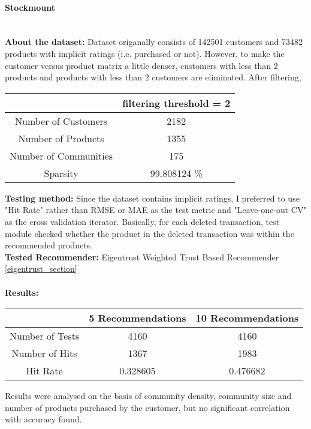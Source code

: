	\paragraph{Stockmount} \mbox{}\\
	\textbf{About the dataset:} Dataset origanally consists of 142501 customers and 73482 products with implicit ratings (i.e. purchased or not). However, to make the customer versus product matrix a little denser, customers with less than 2 products and products with less than 2 customers are eliminated. After filtering,
	\begin{center}
		\begin{tabular}{ | c | c |}
			\hline
			& filtering threshold = 2\\ 
			\hline
			Number of Customers & 2182\\  
			\hline
			Number of Products & 1355\\  
			\hline
			Number of Communities & 175\\  
			\hline
			Sparsity & 99.808124 \% \\   
			\hline
		\end{tabular}
	\end{center} 
	\vspace{0.5cm}
	\textbf{Testing method:} Since the dataset contains implicit ratings, I preferred to use "Hit Rate" rather than RMSE or MAE as the test metric and "Leave-one-out CV" as the cross validation iterator. Basically, for each deleted transaction, test module checked whether the product in the deleted transaction was within the recommended products.\\
	\textbf{Tested Recommender:} Eigentrust Weighted Trust Based Recommender \ref{eigentrust_section} \\ \\
	\textbf{Results:}
	\begin{center}
		\begin{tabular}{ | c | c | c |}
			\hline
			& 5 Recommendations & 10 Recommendations\\ 
			\hline
			Number of Tests&  4160 & 4160\\  
			\hline
			Number of Hits&  1367 & 1983\\  
			\hline
			Hit Rate &   0.328605 & 0.476682\\  
			\hline
		\end{tabular}
	\end{center} 
	Results were analysed on the basis of community density, community size and number of products purchased by the customer, but no significant correlation with accuracy found.
	
